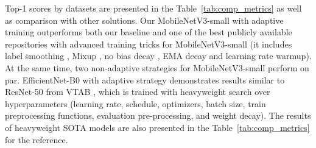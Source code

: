 \documentclass[runningheads]{llncs}
\begin{document}
Top-1 scores by datasets are presented in the Table~\ref{tab:comp_metrics} as well as comparison with other solutions.
Our MobileNetV3-small with adaptive training outperforms both our baseline and one of the best publicly available
repositories with advanced training tricks for MobileNetV3-small (it includes label smoothing \cite{Pereyra2017RegularizingNN},
Mixup \cite{Zhang2018mixupBE}, no bias decay \cite{bagOfTricks}, EMA decay and learning rate warmup). At the same time, two
non-adaptive strategies for MobileNetV3-small perform on par. EfficientNet-B0 with adaptive strategy demonstrates results similar to ResNet-50 from
VTAB \cite{Zhai2019TheVT}, which is trained with heavyweight search over hyperparameters (learning rate, schedule, optimizers, batch size,
train preprocessing functions, evaluation pre-processing, and weight decay).
The results of heavyweight SOTA models are also presented in the Table~\ref{tab:comp_metrics} for the reference.
\end{document}
